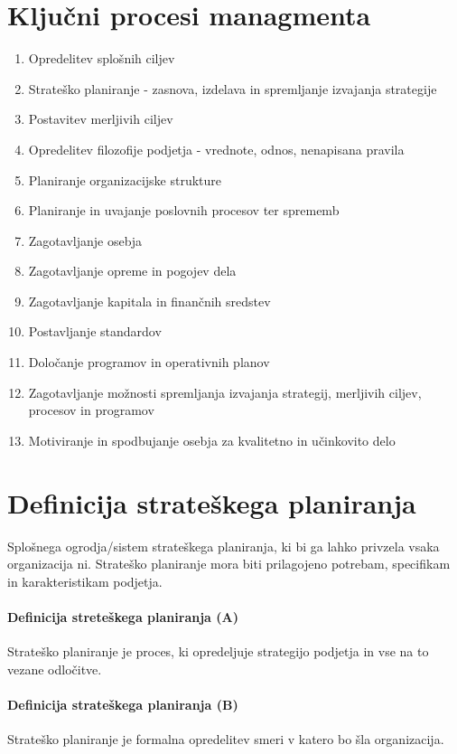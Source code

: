 \documentclass[a4paper,12pt]{report}
\begin{document}
   \section{Ključni procesi managmenta}
         \begin{enumerate}
            \item Opredelitev splošnih ciljev
            \item Strateško planiranje - zasnova, izdelava in spremljanje izvajanja strategije
            \item Postavitev merljivih ciljev
            \item Opredelitev filozofije podjetja - vrednote, odnos, nenapisana pravila
            \item Planiranje organizacijske strukture
            \item Planiranje in uvajanje poslovnih procesov ter sprememb
            \item Zagotavljanje osebja
            \item Zagotavljanje opreme in pogojev dela
            \item Zagotavljanje kapitala in finančnih sredstev
            \item Postavljanje standardov
            \item Določanje programov in operativnih planov
            \item Zagotavljanje možnosti spremljanja izvajanja strategij, merljivih ciljev, procesov in programov
            \item Motiviranje in spodbujanje osebja za kvalitetno in učinkovito delo
         \end{enumerate}

   \section{Definicija strateškega planiranja}
      Splošnega ogrodja/sistem strateškega planiranja, ki bi ga lahko privzela vsaka organizacija ni. Strateško planiranje mora biti prilagojeno potrebam, specifikam in karakteristikam podjetja.
      
      \paragraph{Definicija streteškega planiranja (A)} Strateško planiranje je proces, ki opredeljuje strategijo podjetja in vse na to vezane odločitve.
      \paragraph{Definicija strateškega planiranja (B)} Strateško planiranje je formalna opredelitev smeri v katero bo šla organizacija.
\end{document}
